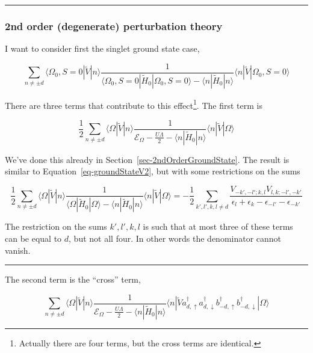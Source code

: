 \documentclass[
  letterpaper,
  DIV=11,
  numbers=noendperiod]{scrartcl}
\begin{document}
\begin{center}\rule{0.5\linewidth}{0.5pt}\end{center}

\subsubsection{2nd order (degenerate) perturbation
theory}\label{nd-order-degenerate-perturbation-theory}

I want to consider first the singlet ground state case,

\begin{equation}
\sum_{n\ne \pm d} \langle\Omega_0,S=0|\tilde V|n\rangle\frac{1}{\langle\Omega_0,S=0|\tilde H_0|\Omega_0,S=0\rangle-\langle n|\tilde H_0|n\rangle}\langle n|\tilde V|\Omega_0,S=0\rangle
\end{equation}

There are three terms that contribute to this effect\footnote{Actually
  there are four terms, but the cross terms are identical.}. The first
term is

\begin{equation}
\frac{1}{2}\sum_{n\ne \pm d}\langle\Omega|\tilde V|n\rangle\frac{1}{\mathcal{E}_\Omega-\frac{U\Lambda}{2}-\langle n|\tilde H_0|n\rangle}\langle n|\tilde V|\Omega\rangle
\end{equation}

We've done this already in Section~\ref{sec-2ndOrderGroundState}. The
result is similar to Equation~\ref{eq-groundStateV2}, but with some
restrictions on the sums

\begin{equation}
\boxed{
\frac{1}{2}\sum_{n\ne\pm d}\langle\Omega|\tilde V|n\rangle\frac{1}{\langle\Omega|\tilde H_0|\Omega\rangle-\langle n|\tilde H_0|n\rangle}\langle n|\tilde V|\Omega\rangle=
-\frac{1}{2}\sum_{k',l',k,l\ne d}\frac{V_{-k',-l';k,l}V_{l,k;-l',-k'}}{\epsilon_l+\epsilon_k-\epsilon_{-l'}-\epsilon_{-k'}}
}
\end{equation}

The restriction on the sums \(k',l',k,l\) is such that at most three of
these terms can be equal to \(d\), but not all four. In other words the
denominator cannot vanish.

\begin{center}\rule{0.5\linewidth}{0.5pt}\end{center}

The second term is the ``cross'' term,

\begin{equation}
\sum_{n\ne \pm d}\langle\Omega|\tilde V|n\rangle\frac{1}{\mathcal{E}_\Omega-\frac{U\Lambda}{2}-\langle n|\tilde H_0|n\rangle}\langle n|\tilde Va^\dagger_{d,\uparrow}a^\dagger_{d,\downarrow}b^\dagger_{-d,\uparrow}b^\dagger_{-d,\downarrow}|\Omega\rangle
\end{equation}
\end{document}
